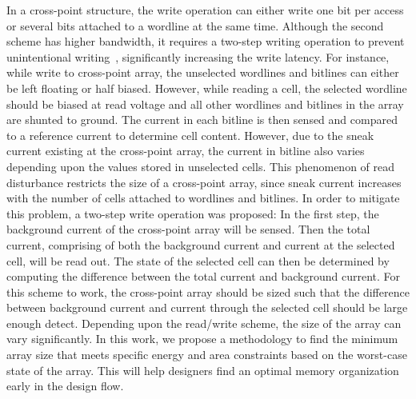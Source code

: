 In a cross-point structure, the write operation can either write one bit per access or several bits attached to a wordline at the same time. Although the second scheme has higher bandwidth, it requires a two-step writing operation to prevent unintentional writing~\cite{memristor:Cong}, significantly increasing the write latency. %
For instance, while write to cross-point array, the unselected wordlines and bitlines can either be left floating or half biased. However, while reading a cell, the selected wordline should be biased at read voltage and all other wordlines and bitlines in the array are shunted to ground. The current in each bitline is then sensed and compared to a reference current to determine cell content. However, due to the sneak current existing at the cross-point array, the current in bitline also varies depending upon the values stored in unselected cells. %
 This phenomenon of read disturbance restricts the size of a cross-point array, since sneak current increases with the number of cells attached to wordlines and bitlines. In order to mitigate this problem, a two-step write operation was proposed: In the first step, the background current of the cross-point array  will be sensed. Then the total current, comprising of both the background current and current at the selected cell, will be read out. The state of the selected cell can then be determined by computing the difference between the total current and background current. For this scheme to work, the cross-point array should be sized such that the difference between background current
 and current through the selected cell should be large enough detect.
Depending upon the read/write scheme, the size of the array can vary significantly. In this work, we propose a methodology to find the minimum array size that meets specific energy and area constraints based on the worst-case state of the array. This will help designers find an optimal memory organization early in the design flow. %


